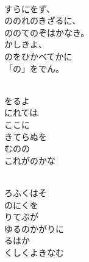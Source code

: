 \documentclass[10pt,b5j]{tarticle} %
\begin{document}
\vspace{1.5em} %
\newcommand{\linespace}{0.5em} %
\newcommand{\blocksize}{0.5\hsize} %
\newcommand{\itemmargin}{6em} %
\begin{enumerate} %
    \setlength{\itemindent}{\itemmargin} %
    \begin{minipage}[c]{\blocksize}
    
        \vspace{\linespace}
        \item~\\
        すらにをず、\\
        ののれのきざるに、\\
        ののてのぞはかなき。\\
        かしきよ、\\
        のをひかべてかに\\
        「の」をでん。
        
        \vspace{\linespace}
        \item~\\
        をるよ\\
        にれては\\
        ここに\\
        きてらぬを\\
        むのの\\
        これがのかな
        
        \vspace{\linespace}
        \item~\\
        ろふくはそ\\
        のにくを\\
        りてぶが\\
        ゆるのかがりに\\
        るはか\\
        くしくよきなむ
        

\end{minipage}
\end{enumerate}
\end{document}
